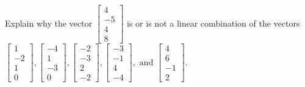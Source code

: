 \documentclass{article}
\begin{document}
\begin{exerciseStatement}
    Explain why the vector \(\left[\begin{array}{c}
4 \\
-5 \\
4 \\
8
\end{array}\right]\)  is or is not a linear
combination of the vectors \(\left[\begin{array}{c}
1 \\
-2 \\
1 \\
0
\end{array}\right] , \left[\begin{array}{c}
-4 \\
1 \\
-3 \\
0
\end{array}\right] , \left[\begin{array}{c}
-2 \\
-3 \\
2 \\
-2
\end{array}\right] , \left[\begin{array}{c}
-3 \\
-1 \\
4 \\
-4
\end{array}\right] , \text{ and } \left[\begin{array}{c}
4 \\
6 \\
-1 \\
2
\end{array}\right]\).



  
\end{exerciseStatement}
\end{document}
